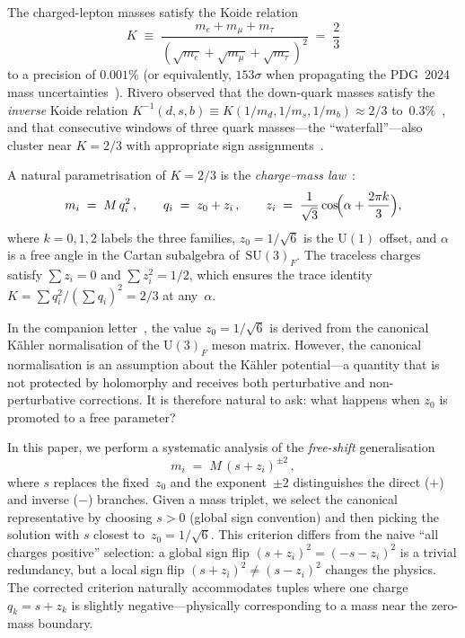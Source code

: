 \documentclass[preprint,12pt]{elsarticle}
\newcommand{\SU}{\mathrm{SU}}
\newcommand{\UU}{\mathrm{U}}
\begin{document}
The charged-lepton masses satisfy the Koide
relation~\cite{Koide:1983qe}
\begin{equation}
  K \;\equiv\; \frac{m_e + m_\mu + m_\tau}
  {(\sqrt{m_e} + \sqrt{m_\mu} + \sqrt{m_\tau})^2}
  \;=\; \frac{2}{3}
  \label{eq:K_def}
\end{equation}
to a precision of $0.001\%$ (or equivalently, $153\sigma$ when
propagating the PDG~2024 mass uncertainties~\cite{PDG:2024}).
Rivero observed that the down-quark masses satisfy the
\emph{inverse} Koide relation
$K^{-1}(d,s,b) \equiv K(1/m_d, 1/m_s, 1/m_b) \approx 2/3$
to~$0.3\%$~\cite{Rivero:2005}, and that consecutive windows of
three quark masses---the ``waterfall''---also cluster near $K = 2/3$
with appropriate sign assignments~\cite{Zenczykowski:2012}.

A natural parametrisation of $K = 2/3$
is the \emph{charge--mass law}~\cite{letter_q2}:
\begin{equation}
  m_i \;=\; M\,q_i^2\,,\qquad
  q_i \;=\; z_0 + z_i\,,\qquad
  z_i \;=\; \frac{1}{\sqrt{3}}\cos\!\Bigl(\alpha + \frac{2\pi k}{3}\Bigr),
  \label{eq:charge_mass}
\end{equation}
where $k = 0, 1, 2$ labels the three families,
$z_0 = 1/\sqrt{6}$ is the $\UU(1)$ offset, and
$\alpha$ is a free angle in the Cartan subalgebra of~$\SU(3)_F$.
The traceless charges satisfy
$\sum z_i = 0$ and $\sum z_i^2 = 1/2$, which ensures the
trace identity
$K = \sum q_i^2 / (\sum q_i)^2 = 2/3$
at any~$\alpha$.

In the companion letter~\cite{letter_q2}, the value
$z_0 = 1/\sqrt{6}$ is derived from the canonical K\"ahler
normalisation of the $\UU(3)_F$ meson matrix.
However, the canonical normalisation is an assumption about the
K\"ahler potential---a quantity that is not protected by holomorphy
and receives both perturbative and non-perturbative corrections.
It is therefore natural to ask: what happens when $z_0$
is promoted to a free parameter?

In this paper, we perform a systematic analysis of the
\emph{free-shift} generalisation
\begin{equation}
  m_i \;=\; M\,(s + z_i)^{\pm 2}\,,
  \label{eq:free_shift}
\end{equation}
where $s$ replaces the fixed~$z_0$ and the exponent~$\pm 2$
distinguishes the direct ($+$) and inverse ($-$) branches.
Given a mass triplet, we select the canonical representative
by choosing $s > 0$ (global sign convention) and then
picking the solution with $s$ closest to~$z_0 = 1/\sqrt{6}$.
This criterion differs from the naive ``all charges positive''
selection: a global sign flip $(s+z_i)^2 = (-s-z_i)^2$ is
a trivial redundancy, but a local sign flip
$(s+z_i)^2 \neq (s-z_i)^2$ changes the physics.  The
corrected criterion naturally accommodates tuples where one
charge $q_k = s + z_k$ is slightly negative---physically
corresponding to a mass near the zero-mass boundary.
\end{document}
